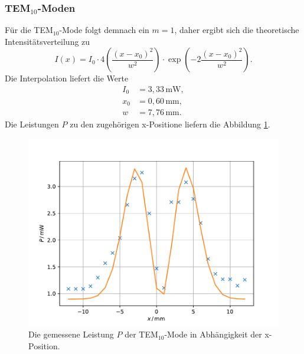\subsubsection{TEM$_{10}$-Moden}
Für die TEM$_{10}$-Mode folgt demnach ein $m=1$, daher ergibt sich die theoretische Intensitätsverteilung
zu 
\begin{equation}
    I(x)=I_0\cdot 4\left(\frac{(x-x_0)^2}{w^2}\right)\cdot\exp\left(-2\frac{(x-x_0)^2}{w^2}\right).
\end{equation}
Die Interpolation liefert die Werte
\begin{align*}
    I_0&=3,33\,\text{mW}{,}\\
    x_0&=0,60\,\text{mm}{,}\\
    w&=7,76\,\text{mm}.
\end{align*}
Die Leistungen $P$ zu den zugehörigen x-Positione liefern die Abbildung \ref{fig:TEM10}.
\begin{figure}
    \center
    \includegraphics[width=\textwidth]{plots/TEM10.pdf}
    \caption{Die gemessene Leistung $P$ der TEM$_{10}$-Mode in Abhängigkeit der x-Position.}
    \label{fig:TEM10}
\end{figure}

